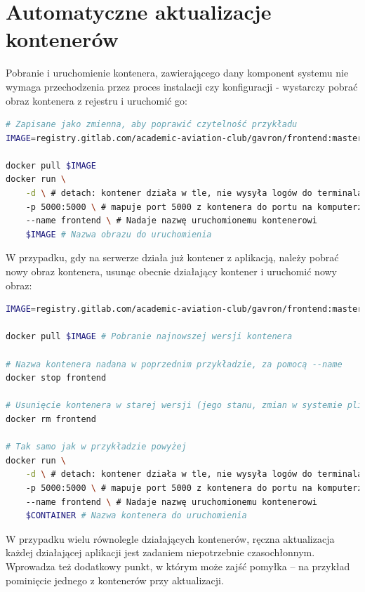 \section{Automatyczne aktualizacje kontenerów}

Pobranie i uruchomienie kontenera, zawierającego dany komponent systemu
nie wymaga przechodzenia przez proces instalacji czy konfiguracji - wystarczy
pobrać obraz kontenera z rejestru i uruchomić go:

\begin{lstlisting}[language=bash, label=list:docker_clone_run_example,caption={Pobranie i uruchomienie obrazu dockera, zawierającego aplikację}, basicstyle=\footnotesize\ttfamily]
# Zapisane jako zmienna, aby poprawić czytelność przykładu 
IMAGE=registry.gitlab.com/academic-aviation-club/gavron/frontend:master

docker pull $IMAGE
docker run \
    -d \ # detach: kontener działa w tle, nie wysyła logów do terminala
    -p 5000:5000 \ # mapuje port 5000 z kontenera do portu na komputerze  
    --name frontend \ # Nadaje nazwę uruchomionemu kontenerowi
    $IMAGE # Nazwa obrazu do uruchomienia 
\end{lstlisting}

W przypadku, gdy na serwerze działa już kontener z aplikacją, należy
pobrać nowy obraz kontenera, usunąc obecnie działający kontener i uruchomić
nowy obraz:

\begin{lstlisting}[language=bash, label=list:docker_update_container,caption={Aktualizacja kontenerów}, basicstyle=\footnotesize\ttfamily]
IMAGE=registry.gitlab.com/academic-aviation-club/gavron/frontend:master

docker pull $IMAGE # Pobranie najnowszej wersji kontenera

# Nazwa kontenera nadana w poprzednim przykładzie, za pomocą --name
docker stop frontend

# Usunięcie kontenera w starej wersji (jego stanu, zmian w systemie plików)
docker rm frontend

# Tak samo jak w przykładzie powyżej
docker run \
    -d \ # detach: kontener działa w tle, nie wysyła logów do terminala
    -p 5000:5000 \ # mapuje port 5000 z kontenera do portu na komputerze  
    --name frontend \ # Nadaje nazwę uruchomionemu kontenerowi
    $CONTAINER # Nazwa kontenera do uruchomienia 
\end{lstlisting}

W przypadku wielu równolegle działających kontenerów, ręczna aktualizacja 
każdej działającej aplikacji jest zadaniem niepotrzebnie czasochłonnym.
Wprowadza też dodatkowy punkt, w którym może zajść pomyłka -- na przykład
pominięcie jednego z kontenerów przy aktualizacji.

